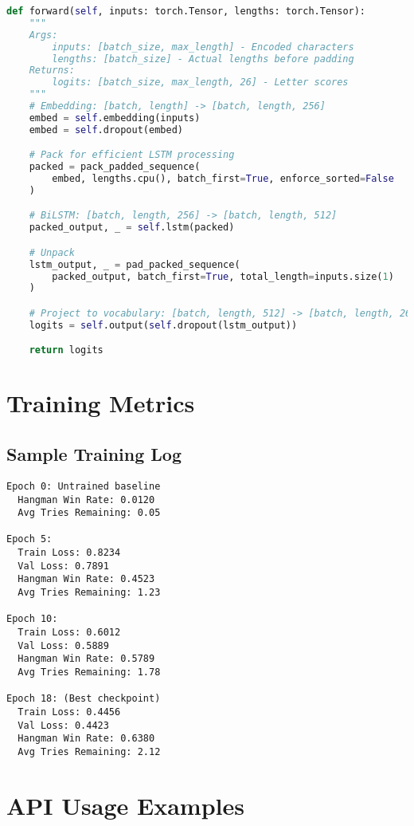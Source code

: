 \documentclass[12pt,a4paper]{article}
\begin{document}
\begin{lstlisting}[language=Python, caption={BiLSTM Forward Pass Implementation}]
def forward(self, inputs: torch.Tensor, lengths: torch.Tensor):
    """
    Args:
        inputs: [batch_size, max_length] - Encoded characters
        lengths: [batch_size] - Actual lengths before padding
    Returns:
        logits: [batch_size, max_length, 26] - Letter scores
    """
    # Embedding: [batch, length] -> [batch, length, 256]
    embed = self.embedding(inputs)
    embed = self.dropout(embed)

    # Pack for efficient LSTM processing
    packed = pack_padded_sequence(
        embed, lengths.cpu(), batch_first=True, enforce_sorted=False
    )

    # BiLSTM: [batch, length, 256] -> [batch, length, 512]
    packed_output, _ = self.lstm(packed)

    # Unpack
    lstm_output, _ = pad_packed_sequence(
        packed_output, batch_first=True, total_length=inputs.size(1)
    )

    # Project to vocabulary: [batch, length, 512] -> [batch, length, 26]
    logits = self.output(self.dropout(lstm_output))

    return logits
\end{lstlisting}

\section{Training Metrics}

\subsection{Sample Training Log}

\begin{verbatim}
Epoch 0: Untrained baseline
  Hangman Win Rate: 0.0120
  Avg Tries Remaining: 0.05

Epoch 5:
  Train Loss: 0.8234
  Val Loss: 0.7891
  Hangman Win Rate: 0.4523
  Avg Tries Remaining: 1.23

Epoch 10:
  Train Loss: 0.6012
  Val Loss: 0.5889
  Hangman Win Rate: 0.5789
  Avg Tries Remaining: 1.78

Epoch 18: (Best checkpoint)
  Train Loss: 0.4456
  Val Loss: 0.4423
  Hangman Win Rate: 0.6380
  Avg Tries Remaining: 2.12
\end{verbatim}

\section{API Usage Examples}
\end{document}
